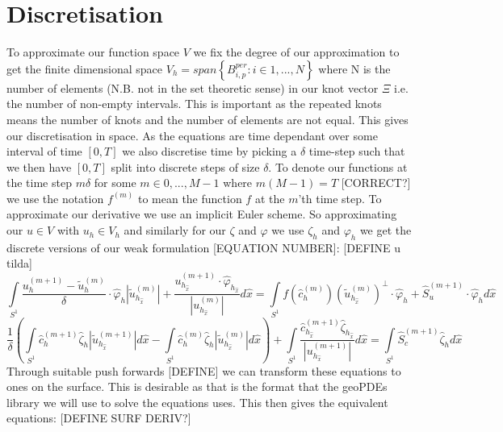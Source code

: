 \documentclass[a4paper, 11pt]{article}
\begin{document}
\section{Discretisation}
To approximate our function space $V$ we fix the degree of our approximation to get the finite dimensional space $V_h=span\left\{B_{i,p}^{per} : i \in 1, ..., N\right\}$ where N is the number of elements (N.B. not in the set theoretic sense) in our knot vector $\Xi$ i.e. the number of non-empty intervals. This is important as the repeated knots means the number of knots and the number of elements are not equal. This gives our discretisation in space. As the equations are time dependant over some interval of time $[0, T]$ we also discretise time by picking a $\delta$ time-step such that we then have $[0, T]$ split into discrete steps of size $\delta$. To denote our functions at the time step $m\delta$ for some $m \in 0,...,M-1$ where $m(M-1)=T$ [CORRECT?] we use the notation $f^{\left(m\right)}$ to mean the function $f$ at the $m$'th time step. To approximate our derivative we use an implicit Euler scheme. So approximating our $u \in V$ with $u_h \in V_h$ and similarly for our $\zeta$ and $\varphi$ we use $\zeta_h$ and $\varphi_h$ we get the discrete versions of our weak formulation [EQUATION NUMBER]: [DEFINE u tilda] 
\begin{equation}
  \int\limits_{S^1}\frac{u_h^{\left(m+1\right)}-\widetilde{u}_h^{\left(m\right)}}{\delta}\cdot\hat{\varphi}_h|\widetilde{u}_{h_{\hat{x}}}^{\left(m\right)}| + \frac{u_{h_{\hat{x}}}^{\left(m+1\right)}\cdot\hat{\varphi}_{h_{\hat{x}}}}{|u_{h_{\hat{x}}}^{\left(m\right)}|}d\hat{x} = \int\limits_{S^1}f(\hat{c}_h^{\left(m\right)})\left(\widetilde{u}_{h_{\hat{x}}}^{\left(m\right)}\right)^\bot\cdot\hat{\varphi}_h + \hat{S}_u^{\left(m+1\right)}\cdot\hat{\varphi}_hd\hat{x}
\end{equation}
\begin{equation}
  \frac{1}{\delta}\left(\int\limits_{S^1}\hat{c}_h^{\left(m+1\right)}\hat{\zeta}_h|\widetilde{u}_{h_{\hat{x}}}^{\left(m+1\right)}|d\hat{x} - \int\limits_{S^1}\hat{c}_h^{\left(m\right)}\hat{\zeta}_h|\widetilde{u}_{h_{\hat{x}}}^{\left(m\right)}|d\hat{x}\right) + \int\limits_{S^1}\frac{\hat{c}_{h_{\hat{x}}}^{\left(m+1\right)}\hat{\zeta}_{h_{\hat{x}}}}{|u_{h_{\hat{x}}}^{\left(m+1\right)}|}d\hat{x} = \int\limits_{S^1}\hat{S}_c^{\left(m+1\right)}\hat{\zeta}_hd\hat{x}
\end{equation}
Through suitable push forwards [DEFINE] we can transform these equations to ones on the surface. This is desirable as that is the format that the geoPDEs library we will use to solve the equations uses. This then gives the equivalent equations: [DEFINE SURF DERIV?]
\end{document}
